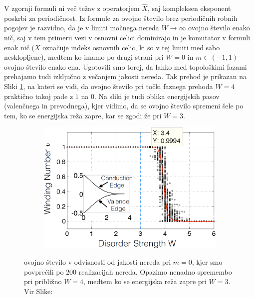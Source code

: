 V zgornji formuli ni več težav z operatorjem $\hat{X}$, saj kompleksen eksponent poskrbi za periodičnost.
Iz formule za ovojno število brez periodičnih robnih pogojev je razvidno, da je v limiti močnega nereda $W \to \infty$ ovojno število enako nič, saj v tem primeru vezi v osnovni celici dominirajo in je komutator v formuli enak nič ($X$ označuje indeks osnovnih celic, ki so v tej limiti med sabo nesklopljene), medtem ko imamo po drugi strani pri $W=0$ in $m \in (-1,1)$ ovojno število enako ena. Ugotovili smo torej, da lahko med topološkimi fazami prehajamo tudi izključno z večanjem jakosti nereda. Tak prehod je prikazan na Sliki \ref{fig:InvariantVsW}, na kateri se vidi, da ovojno število pri točki faznega prehoda $W=4$ praktično takoj pade z $1$ na $0$. Na sliki je tudi oblika energijskih pasov (valenčnega in prevodnega), kjer vidimo, da se ovojno število spremeni šele po tem, ko se energijska reža zapre, kar se zgodi že pri $W=3$.
\begin{figure}[H]
\centering
\begin{subfigure}{.7\textwidth}
\includegraphics[width=\linewidth]{Figures/InvariantVsW.png}
\end{subfigure}
\caption{ovojno število v odvisnosti od jakosti nereda pri $m=0$, kjer smo povprečili po $200$ realizacijah nereda. Opazimo nenadno spremembo pri približno $W=4$, medtem ko se energijska reža zapre pri $W=3$. Vir Slike: \cite{mondragon}}
\label{fig:InvariantVsW}
\end{figure}


